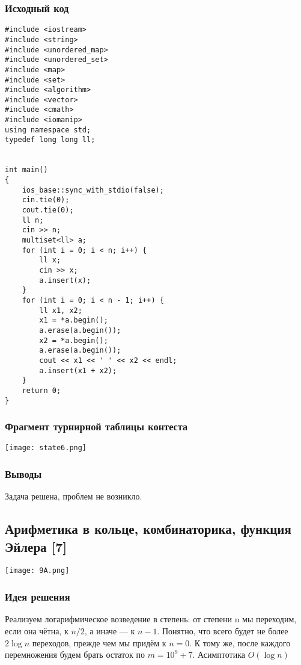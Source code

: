\documentclass[12pt]{article}
\begin{document}
\subsubsection*{Исходный код}
\begin{lstlisting}
#include <iostream>
#include <string>
#include <unordered_map>
#include <unordered_set>
#include <map>
#include <set>
#include <algorithm>
#include <vector>
#include <cmath>
#include <iomanip>
using namespace std;
typedef long long ll;


int main()
{
    ios_base::sync_with_stdio(false);
    cin.tie(0);
    cout.tie(0);
    ll n;
    cin >> n;
    multiset<ll> a;
    for (int i = 0; i < n; i++) {
        ll x;
        cin >> x;
        a.insert(x);
    }
    for (int i = 0; i < n - 1; i++) {
        ll x1, x2;
        x1 = *a.begin();
        a.erase(a.begin());
        x2 = *a.begin();
        a.erase(a.begin());
        cout << x1 << ' ' << x2 << endl;
        a.insert(x1 + x2);
    }
    return 0;
}
\end{lstlisting}
\subsubsection*{Фрагмент турнирной таблицы контеста}
\begin{center}
\texttt{[image: state6.png]}\newline\noindent
\end{center}

\subsubsection*{Выводы}
Задача решена, проблем не возникло.
\subsection*{Арифметика в кольце, комбинаторика, функция Эйлера [7] }
\begin{center}
\texttt{[image: 9A.png]}
\end{center}
\subsubsection*{Идея решения}
Реализуем логарифмическое возведение в степень: от степени n мы переходим, если она чётна, к $n / 2$, а иначе — к $n-1$. Понятно, что всего будет не более $2 \log n$ переходов, прежде чем мы придём к $n = 0$. К тому же, после каждого перемножения будем брать остаток по $m=10^9+7$. Асимптотика $O(\log{}n)$
\end{document}
